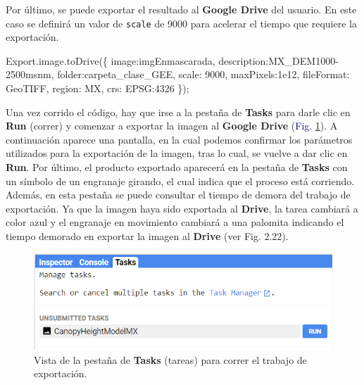\documentclass[
  12pt,
  letterpaper,
  twoside]{book}
\newenvironment{Shaded}{\begin{snugshade}}{\end{snugshade}}
\newcommand{\AttributeTok}[1]{\textcolor[rgb]{0.48,0.12,0.64}{#1}}
\newcommand{\DataTypeTok}[1]{\textcolor[rgb]{0.00,0.00,0.00}{#1}}
\newcommand{\DecValTok}[1]{\textcolor[rgb]{0.28,0.53,0.93}{#1}}
\newcommand{\FloatTok}[1]{\textcolor[rgb]{0.28,0.53,0.93}{#1}}
\newcommand{\FunctionTok}[1]{\textcolor[rgb]{0.48,0.12,0.64}{#1}}
\newcommand{\NormalTok}[1]{#1}
\newcommand{\OperatorTok}[1]{\textcolor[rgb]{0.00,0.00,0.00}{#1}}
\newcommand{\StringTok}[1]{\textcolor[rgb]{0.87,0.29,0.22}{#1}}
\begin{document}
Por último, se puede exportar el resultado al \textbf{Google Drive} del usuario. En este caso se definirá un valor de \texttt{scale} de 9000 para acelerar el tiempo que requiere la exportación.

\begin{Shaded}
\begin{Highlighting}[]
\NormalTok{Export}\OperatorTok{.}\AttributeTok{image}\OperatorTok{.}\FunctionTok{toDrive}\NormalTok{(\{}
  \DataTypeTok{image}\OperatorTok{:}\NormalTok{imgEnmascarada}\OperatorTok{,} 
  \DataTypeTok{description}\OperatorTok{:}\StringTok{\textquotesingle{}MX\_DEM1000{-}2500msnm\textquotesingle{}}\OperatorTok{,}
  \DataTypeTok{folder}\OperatorTok{:}\StringTok{\textquotesingle{}carpeta\_clase\_GEE\textquotesingle{}}\OperatorTok{,}
  \DataTypeTok{scale}\OperatorTok{:} \DecValTok{9000}\OperatorTok{,}
  \DataTypeTok{maxPixels}\OperatorTok{:}\FloatTok{1e12}\OperatorTok{,}
  \DataTypeTok{fileFormat}\OperatorTok{:} \StringTok{\textquotesingle{}GeoTIFF\textquotesingle{}}\OperatorTok{,}
  \DataTypeTok{region}\OperatorTok{:}\NormalTok{ MX}\OperatorTok{,}
  \DataTypeTok{crs}\OperatorTok{:} \StringTok{\textquotesingle{}EPSG:4326\textquotesingle{}}
\NormalTok{\})}\OperatorTok{;}
\end{Highlighting}
\end{Shaded}

Una vez corrido el código, hay que irse a la pestaña de \textbf{Tasks} para darle clic en \textbf{Run} (correr) y comenzar a exportar la imagen al \textbf{Google Drive} (\textcolor{darkblue}{Fig.} \ref{fig:f915}). A continuación aparece una pantalla, en la cual podemos confirmar los parámetros utilizados para la exportación de la imagen, tras lo cual, se vuelve a dar clic en \textbf{Run}. Por último, el producto exportado aparecerá en la pestaña de \textbf{Tasks} con un símbolo de un engranaje girando, el cual indica que el proceso está corriendo. Además, en esta pestaña se puede consultar el tiempo de demora del trabajo de exportación. Ya que la imagen haya sido exportada al \textbf{Drive}, la tarea cambiará a color azul y el engranaje en movimiento cambiará a una palomita indicando el tiempo demorado en exportar la imagen al \textbf{Drive} (ver Fig. 2.22).

\begin{figure}[H]

{\centering \includegraphics[width=0.95\linewidth]{Img/exportCHMMX} 

}

\caption{Vista de la pestaña de \textbf{Tasks} (tareas) para correr el trabajo de exportación.}\label{fig:f915}
\end{figure}
\end{document}
